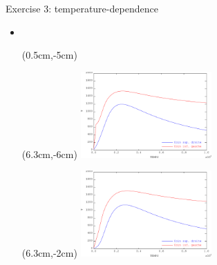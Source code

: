 \begin{frame}{
                 {Exercise 3: temperature-dependence}}
  \footnotesize
  \begin{itemize}
    \item {}\\
    \vspace{5cm}
    \begin{textblock*}{5cm}(0.5cm,-5cm)
    \end{textblock*}
    \begin{textblock*}{5cm}(6.3cm,-6cm)
      \includegraphics[width=5cm]{images/exo/exo_3_solu_evol}
    \end{textblock*}
    \begin{textblock*}{5cm}(6.3cm,-2cm)
      \includegraphics[width=5cm]{images/exo/exo_3_solu_bis_evol}
    \end{textblock*}
  \end{itemize}
\end{frame}
